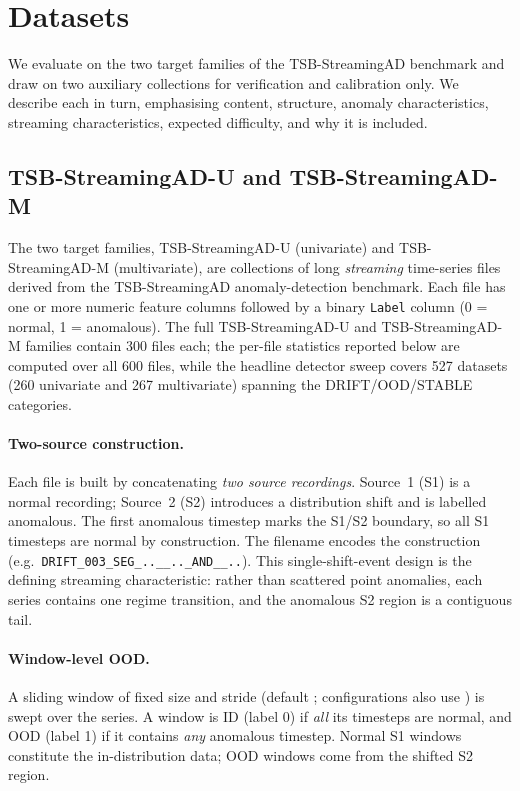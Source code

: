 \documentclass[11pt]{article}
\begin{document}
\section{Datasets}\label{sec:datasets}

We evaluate on the two target families of the TSB-StreamingAD benchmark and draw on
two auxiliary collections for verification and calibration only. We describe each in
turn, emphasising content, structure, anomaly characteristics, streaming
characteristics, expected difficulty, and why it is included.

\subsection{TSB-StreamingAD-U and TSB-StreamingAD-M}\label{sec:tsb}

The two target families, TSB-StreamingAD-U (univariate) and TSB-StreamingAD-M
(multivariate), are collections of long \emph{streaming} time-series files derived
from the TSB-StreamingAD anomaly-detection benchmark. Each file has one or more
numeric feature columns followed by a binary \texttt{Label} column (0 = normal, 1 =
anomalous). The full TSB-StreamingAD-U and TSB-StreamingAD-M families contain
\num{300} files each; the per-file statistics reported below are computed over all
\num{600} files, while the headline detector sweep covers \num{527} datasets
(\num{260} univariate and \num{267} multivariate) spanning the DRIFT/OOD/STABLE
categories.

\paragraph{Two-source construction.}
Each file is built by concatenating \emph{two source recordings}. Source~1 (S1) is a
normal recording; Source~2 (S2) introduces a distribution shift and is labelled
anomalous. The first anomalous timestep marks the S1/S2 boundary, so all S1
timesteps are normal by construction. The filename encodes the construction (e.g.\
\texttt{DRIFT\_003\_SEG\_..\_<SRC1>\_..\_AND\_<SRC2>\_..}). This single-shift-event
design is the defining streaming characteristic: rather than scattered point
anomalies, each series contains one regime transition, and the anomalous S2 region
is a contiguous tail.

\paragraph{Window-level OOD.}
A sliding window of fixed size and stride (default ; configurations
also use \numproduct{128 x 64}) is swept over the series. A window is ID (label 0) if
\emph{all} its timesteps are normal, and OOD (label 1) if it contains \emph{any}
anomalous timestep. Normal S1 windows constitute the in-distribution data; OOD
windows come from the shifted S2 region.
\end{document}
